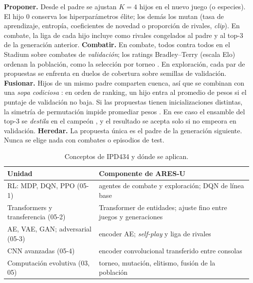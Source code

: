 \documentclass[conference]{IEEEtran}
\begin{document}
\textbf{Proponer.} Desde el padre se ajustan $K=4$ hijos en el nuevo juego (o especies). El hijo 0 conserva los hiperparámetros élite; los demás los mutan (tasa de aprendizaje, entropía, coeficientes de novedad o proporción de rivales, \emph{clip}). En combate, la liga de cada hijo incluye como rivales congelados al padre y al top-3 de la generación anterior.
\textbf{Combatir.} En combate, todos contra todos en el Stadium sobre combates de \emph{validación}; los ratings Bradley--Terry \cite{hunter2004bt} (escala Elo) ordenan la población, como la selección por torneo \cite{miller1995tournament}. En exploración, cada par de propuestas se enfrenta en duelos de cobertura sobre semillas de validación.
\textbf{Fusionar.} Hijos de un mismo padre comparten cuenca, así que se combinan con una \emph{sopa codiciosa} \cite{wortsman2022soups}: en orden de ranking, un hijo entra al promedio de pesos si el puntaje de validación no baja. Si las propuestas tienen inicializaciones distintas, la simetría de permutación impide promediar pesos \cite{ainsworth2023rebasin}. En ese caso el ensamble del top-3 se \emph{destila} en el campeón \cite{hinton2015distill,rusu2016policydistill}, y el resultado se acepta solo si no empeora en validación.
\textbf{Heredar.} La propuesta única es el padre de la generación siguiente. Nunca se elige nada con combates o episodios de test.

\begin{table}[t]
\caption{Conceptos de IPD434 y dónde se aplican.}
\label{tab:curso}
\centering\scriptsize\setlength{\tabcolsep}{3pt}
\begin{tabular}{L{0.36\columnwidth}L{0.56\columnwidth}}
\toprule
Unidad & Componente de ARES-U \\
\midrule
RL: MDP, DQN, PPO (05-1) & agentes de combate y exploración; DQN de línea base \\
Transformers y transferencia (05-2) & Transformer de entidades; ajuste fino entre juegos y generaciones \\
AE, VAE, GAN; adversarial (05-3) & encoder AE; \emph{self-play} y liga de rivales \\
CNN avanzadas (05-4) & encoder convolucional transferido entre consolas \\
Computación evolutiva (03, 05) & torneo, mutación, elitismo, fusión de la población \\
\bottomrule
\end{tabular}
\end{table}
\end{document}
